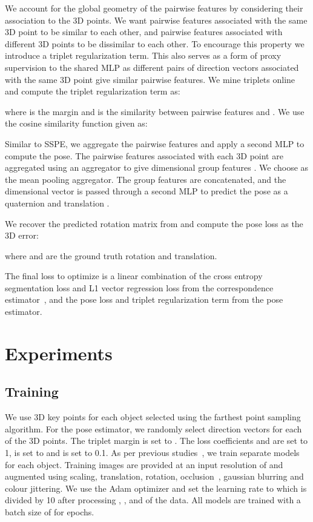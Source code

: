 \documentclass{article}
\begin{document}
We account for the global geometry of the pairwise features by considering their association to the 3D points. We want pairwise features associated with the same 3D point to be similar to each other, and pairwise features associated with different 3D points to be dissimilar to each other. To encourage this property we introduce a triplet regularization term. This also serves as a form of proxy supervision to the shared MLP  as different pairs of direction vectors associated with the same 3D point give similar pairwise features. 
We mine triplets online and compute the triplet regularization term as:

where  is the margin and  is the similarity between pairwise features  and . We use the cosine similarity function given as:




Similar to SSPE, we aggregate the pairwise features and apply a second MLP to compute the pose. 
The pairwise features associated with each 3D point are aggregated using an aggregator  to give   dimensional group features . We choose  as the mean pooling aggregator. 
The group features are concatenated, and the  dimensional vector is passed through a second MLP  to predict the pose as a quaternion  and translation . 


We recover the predicted rotation matrix  from  and compute the pose loss  as the 3D error:

where  and  are the ground truth rotation and translation.

The final loss  to optimize is a linear combination of the cross entropy segmentation loss  and L1 vector regression loss  from the correspondence estimator~\cite{peng2019pvnet}, and the pose loss  and triplet regularization term  from the pose estimator.




\section{Experiments}









\subsection{Training}

We use  3D key points for each object selected using the farthest point sampling algorithm. For the pose estimator, we randomly select  direction vectors for each of the 3D points. The triplet margin  is set to . The loss coefficients  and  are set to 1,  is set to  and  is set to 0.1. As per previous studies~\cite{peng2019pvnet}\cite{hu2020single}, we train separate models for each object. Training images are provided at an input resolution of  and augmented using scaling, translation, rotation, occlusion~\cite{zhong2020random}, gaussian blurring and colour jittering. We use the Adam optimizer and set the learning rate to  which is divided by 10 after processing , , and  of the data. All models are trained with a batch size of  for  epochs.
\end{document}
